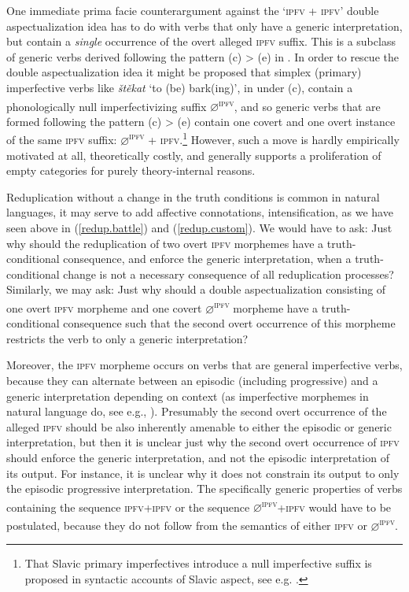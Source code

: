 \documentclass[output=paper,colorlinks,citecolor=brown]{langscibook}
\begin{document}
One immediate prima facie counterargument against the
`\textsc{ipfv} + \textsc{ipfv}' double aspectualization idea has to do with verbs that only have a generic interpretation, but
contain a \textit{single} occurrence of the overt
alleged  \textsc{ipfv} suffix. This is a subclass of generic verbs derived following the pattern (c) > (e) in .
In order to rescue the double aspectualization idea it might be proposed that simplex (primary) imperfective verbs like \textit{štěkat} `to (be) bark(ing)',
in  under (c), contain a phonologically null imperfectivizing suffix
$\varnothing$\textsuperscript{\textsc{ipfv}},
and so generic verbs that are formed following the pattern (c) > (e) contain one covert and
one overt instance of 
the same \textsc{ipfv} suffix: $\varnothing$\textsuperscript{\textsc{ipfv}} + \textsc{ipfv}.\footnote{That Slavic primary imperfectives introduce a null imperfective suffix is
proposed in syntactic accounts of Slavic aspect, see e.g. .}
However, such a move is hardly empirically motivated at all, theoretically costly, and generally supports a proliferation of empty categories for purely theory-internal reasons.

Reduplication without a change in the truth conditions is common in natural languages, it may serve to add affective connotations, intensification, as we have seen above in (\ref{redup.battle}) and (\ref{redup.custom}).
We would have to ask: Just why should the reduplication of
two overt \textsc{ipfv} morphemes have a truth-conditional consequence, and enforce the generic interpretation, when
a truth-conditional change is not a necessary consequence of all reduplication processes?
Similarly, we may ask: Just why
should a double aspectualization consisting of one overt  \textsc{ipfv} morpheme and one covert $\varnothing$\textsuperscript{\textsc{ipfv}} morpheme
have a truth-conditional consequence such that the second overt occurrence of this morpheme restricts the verb to only a generic interpretation?

Moreover, the \textsc{ipfv} morpheme occurs on verbs
that are general imperfective verbs, because
they can  alternate
between an episodic (including progressive) and a generic interpretation depending
on context (as
imperfective morphemes in natural language do,
see e.g., \citealt{Comrie1976}).
Presumably the second overt occurrence of the alleged \textsc{ipfv} should be also inherently amenable to either the episodic or generic
interpretation, but then it is unclear just why the second overt occurrence of \textsc{ipfv} should enforce the
generic interpretation, and not the episodic
interpretation of its output.
For instance, it is unclear why it does not constrain its output to only
the episodic progressive interpretation.
The specifically generic properties of verbs containing the
sequence \textsc{ipfv}+\textsc{ipfv} or
the sequence $\varnothing$\textsuperscript{\textsc{ipfv}}+\textsc{ipfv} would have to be postulated, because they do not follow from the semantics of either \textsc{ipfv} or $\varnothing$\textsuperscript{\textsc{ipfv}}.
\end{document}
